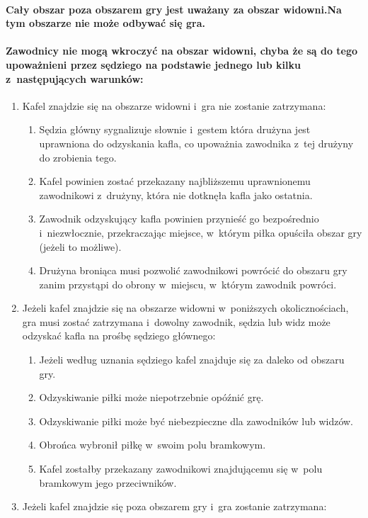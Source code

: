 \documentclass[12pt]{article}
\begin{document}
\paragraph{ Cały obszar poza obszarem gry jest uważany za obszar
	widowni.Na tym obszarze nie może odbywać się gra.}

\paragraph{ Zawodnicy nie mogą wkroczyć na obszar widowni, chyba
	że są do tego upoważnieni przez sędziego na podstawie jednego lub kilku
 z~następujących warunków:}

\begin{enumerate}
	\item
	      Kafel znajdzie się na obszarze widowni i~gra nie zostanie zatrzymana:

	      \begin{enumerate}
		      \item
		            Sędzia główny sygnalizuje słownie i~gestem która drużyna jest
		            uprawniona do odzyskania kafla, co upoważnia zawodnika z~tej drużyny
		            do zrobienia tego.
		      \item
		            Kafel powinien zostać przekazany najbliższemu uprawnionemu
		            zawodnikowi z~drużyny, która nie dotknęła kafla jako ostatnia.
		      \item
		            Zawodnik odzyskujący kafla powinien przynieść go bezpośrednio i~niezwłocznie, przekraczając miejsce, w~którym piłka opuściła obszar
		            gry (jeżeli to możliwe).
		      \item
		            Drużyna broniąca musi pozwolić zawodnikowi powrócić do obszaru gry
		            zanim przystąpi do obrony w~miejscu, w~którym zawodnik powróci.
	      \end{enumerate}
	\item
	      Jeżeli kafel znajdzie się na obszarze widowni w~poniższych
	      okolicznościach, gra musi zostać zatrzymana i~dowolny zawodnik, sędzia
	      lub widz może odzyskać kafla na prośbę sędziego głównego:

	      \begin{enumerate}
		      \item
		            Jeżeli według uznania sędziego kafel znajduje się za daleko od
		            obszaru gry.
		      \item
		            Odzyskiwanie piłki może niepotrzebnie opóźnić grę.
		      \item
		            Odzyskiwanie piłki może być niebezpieczne dla zawodników lub widzów.
		      \item
		            Obrońca wybronił piłkę w~swoim polu bramkowym.
		      \item
		            Kafel zostałby przekazany zawodnikowi znajdującemu się w~polu
		            bramkowym jego przeciwników.
	      \end{enumerate}
	\item
	      Jeżeli kafel znajdzie się poza obszarem gry i~gra zostanie zatrzymana:


\end{enumerate}
\end{document}
